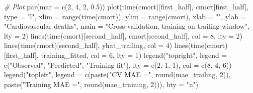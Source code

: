 \documentclass[
]{article}
\newenvironment{Shaded}{\begin{snugshade}}{\end{snugshade}}
\newcommand{\AttributeTok}[1]{\textcolor[rgb]{0.77,0.63,0.00}{#1}}
\newcommand{\CommentTok}[1]{\textcolor[rgb]{0.56,0.35,0.01}{\textit{#1}}}
\newcommand{\DecValTok}[1]{\textcolor[rgb]{0.00,0.00,0.81}{#1}}
\newcommand{\FloatTok}[1]{\textcolor[rgb]{0.00,0.00,0.81}{#1}}
\newcommand{\FunctionTok}[1]{\textcolor[rgb]{0.00,0.00,0.00}{#1}}
\newcommand{\NormalTok}[1]{#1}
\newcommand{\StringTok}[1]{\textcolor[rgb]{0.31,0.60,0.02}{#1}}
\begin{document}
\begin{Shaded}
\begin{Highlighting}[]
\CommentTok{\# Plot}
\FunctionTok{par}\NormalTok{(}\AttributeTok{mar =} \FunctionTok{c}\NormalTok{(}\DecValTok{2}\NormalTok{, }\DecValTok{4}\NormalTok{, }\DecValTok{2}\NormalTok{, }\FloatTok{0.5}\NormalTok{))}
\FunctionTok{plot}\NormalTok{(}\FunctionTok{time}\NormalTok{(cmort)[first\_half], cmort[first\_half], }\AttributeTok{type =} \StringTok{"l"}\NormalTok{, }
     \AttributeTok{xlim =} \FunctionTok{range}\NormalTok{(}\FunctionTok{time}\NormalTok{(cmort)), }\AttributeTok{ylim =} \FunctionTok{range}\NormalTok{(cmort),}
     \AttributeTok{xlab =} \StringTok{""}\NormalTok{, }\AttributeTok{ylab =} \StringTok{"Cardiovascular deaths"}\NormalTok{, }
     \AttributeTok{main =} \StringTok{"Cross{-}validation, training on trailing window"}\NormalTok{, }\AttributeTok{lty =} \DecValTok{2}\NormalTok{)}
\FunctionTok{lines}\NormalTok{(}\FunctionTok{time}\NormalTok{(cmort)[second\_half], cmort[second\_half], }\AttributeTok{col =} \DecValTok{8}\NormalTok{, }\AttributeTok{lty =} \DecValTok{2}\NormalTok{)}
\FunctionTok{lines}\NormalTok{(}\FunctionTok{time}\NormalTok{(cmort)[second\_half], yhat\_trailing, }\AttributeTok{col =} \DecValTok{4}\NormalTok{)}
\FunctionTok{lines}\NormalTok{(}\FunctionTok{time}\NormalTok{(cmort)[first\_half], training\_fitted, }\AttributeTok{col =} \DecValTok{6}\NormalTok{, }\AttributeTok{lty =} \DecValTok{1}\NormalTok{)}
\FunctionTok{legend}\NormalTok{(}\StringTok{"topright"}\NormalTok{, }\AttributeTok{legend =} \FunctionTok{c}\NormalTok{(}\StringTok{"Observed"}\NormalTok{, }\StringTok{"Predicted"}\NormalTok{, }\StringTok{"Training fit"}\NormalTok{), }
       \AttributeTok{lty =} \FunctionTok{c}\NormalTok{(}\DecValTok{2}\NormalTok{, }\DecValTok{1}\NormalTok{, }\DecValTok{1}\NormalTok{), }\AttributeTok{col =} \FunctionTok{c}\NormalTok{(}\DecValTok{8}\NormalTok{, }\DecValTok{4}\NormalTok{, }\DecValTok{6}\NormalTok{))}
\FunctionTok{legend}\NormalTok{(}\StringTok{"topleft"}\NormalTok{, }\AttributeTok{legend =} \FunctionTok{c}\NormalTok{(}\FunctionTok{paste}\NormalTok{(}\StringTok{"CV MAE ="}\NormalTok{, }\FunctionTok{round}\NormalTok{(mae\_trailing, }\DecValTok{2}\NormalTok{)), }
                             \FunctionTok{paste}\NormalTok{(}\StringTok{"Training MAE ="}\NormalTok{, }\FunctionTok{round}\NormalTok{(mae\_training, }\DecValTok{2}\NormalTok{))),}
       \AttributeTok{bty =} \StringTok{"n"}\NormalTok{)}
\end{Highlighting}
\end{Shaded}
\end{document}
